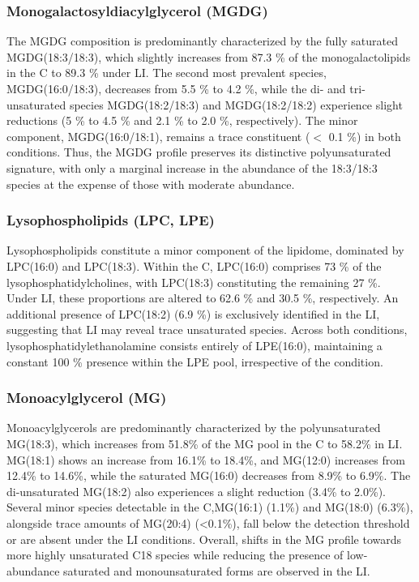 \documentclass[10pt,letterpaper]{article}
\begin{document}
\subsubsection*{Monogalactosyldiacylglycerol (MGDG)}
The MGDG composition is predominantly characterized by the fully saturated MGDG(18:3/18:3), which slightly increases from 87.3 \% of the monogalactolipids in the C to 89.3 \% under LI. The second most prevalent species, MGDG(16:0/18:3), decreases from 5.5 \% to 4.2 \%, while the di- and tri-unsaturated species MGDG(18:2/18:3) and MGDG(18:2/18:2) experience slight reductions (5 \% to 4.5 \% and 2.1 \% to 2.0 \%, respectively). The minor component, MGDG(16:0/18:1), remains a trace constituent ($<$ 0.1 \%) in both conditions. Thus, the MGDG profile preserves its distinctive polyunsaturated signature, with only a marginal increase in the abundance of the 18:3/18:3 species at the expense of those with moderate abundance.

\subsubsection*{Lysophospholipids (LPC, LPE)}
Lysophospholipids constitute a minor component of the lipidome, dominated by LPC(16:0) and LPC(18:3). Within the C, LPC(16:0) comprises 73 \% of the lysophosphatidylcholines, with LPC(18:3) constituting the remaining 27 \%. Under LI, these proportions are altered to 62.6 \% and 30.5 \%, respectively. An additional presence of LPC(18:2) (6.9 \%) is exclusively identified in the LI, suggesting that LI may reveal trace unsaturated species. Across both conditions, lysophosphatidylethanolamine consists entirely of LPE(16:0), maintaining a constant 100 \% presence within the LPE pool, irrespective of the condition.

\subsubsection*{Monoacylglycerol (MG)} 
Monoacylglycerols are predominantly characterized by the polyunsaturated MG(18:3), which increases from 51.8\% of the MG pool in the C to 58.2\% in LI. MG(18:1) shows an increase from 16.1\% to 18.4\%, and MG(12:0) increases from 12.4\% to 14.6\%, while the saturated MG(16:0) decreases from 8.9\% to 6.9\%. The di-unsaturated MG(18:2) also experiences a slight reduction (3.4\% to 2.0\%). Several minor species detectable in the C,MG(16:1) (1.1\%) and MG(18:0) (6.3\%), alongside trace amounts of MG(20:4) (\textless0.1\%), fall below the detection threshold or are absent under the LI conditions. Overall, shifts in the MG profile towards more highly unsaturated C18 species while reducing the presence of low-abundance saturated and monounsaturated forms are observed in the LI.
\end{document}
